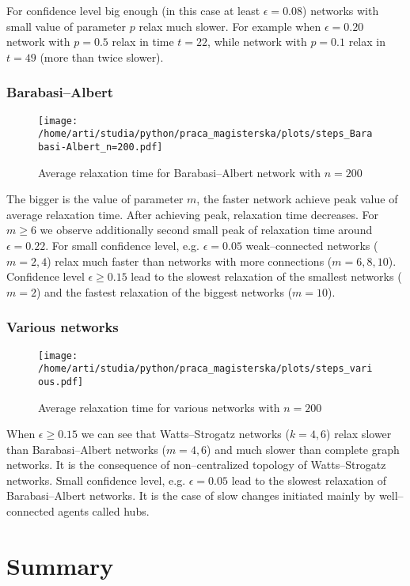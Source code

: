 \documentclass{article}
\begin{document}
For confidence level big enough (in this case at least $\epsilon=0.08$) networks with small value of parameter $p$ relax much slower. For example when $\epsilon=0.20$ network with $p=0.5$ relax in time $t=22$, while network with $p=0.1$ relax in $t=49$ (more than twice slower). 

\subsubsection{Barabasi--Albert}

\begin{figure}[H]
		\centering
		\texttt{[image: /home/arti/studia/python/praca\_magisterska/plots/steps\_Barabasi-Albert\_n=200.pdf]}
		\caption{Average relaxation time for Barabasi--Albert network with $n=200$}
\end{figure}

The bigger is the value of parameter $m$, the faster network achieve peak value of average relaxation time. After achieving peak, relaxation time decreases. For $m \geq 6$ we observe additionally second small peak of relaxation time around $\epsilon=0.22$. For small confidence level, e.g. $\epsilon=0.05$ weak--connected networks ($m=2,4$) relax much faster than networks with more connections ($m=6,8,10$). Confidence level $\epsilon \geq 0.15$ lead to the slowest relaxation of the smallest networks ($m=2$) and the fastest relaxation of the biggest networks ($m=10$). 

\subsubsection{Various networks}

\begin{figure}[H]
		\centering
		\texttt{[image: /home/arti/studia/python/praca\_magisterska/plots/steps\_various.pdf]}
		\caption{Average relaxation time for various networks with $n=200$}
\end{figure}

When $\epsilon \geq 0.15$ we can see that Watts--Strogatz networks ($k=4,6$) relax slower than Barabasi--Albert networks ($m=4,6$) and much slower than complete graph networks. It is the consequence of non--centralized topology of Watts--Strogatz networks. Small confidence level, e.g. $\epsilon=0.05$ lead to the slowest relaxation of Barabasi--Albert networks. It is the case of slow changes initiated mainly by well--connected agents called hubs.

\section{Summary}
\indent
\end{document}
